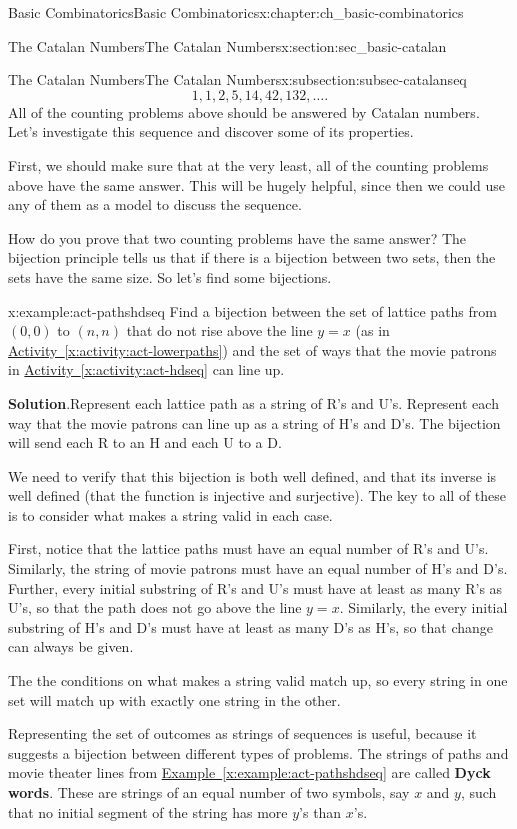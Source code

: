\documentclass[oneside,10pt,]{book}
\newcommand{\terminology}[1]{\textbf{#1}}
\numberwithin{equation}{chapter}
\begin{document}
\begin{chapterptx}{Basic Combinatorics}{}{Basic Combinatorics}{}{}{x:chapter:ch_basic-combinatorics}
\begin{sectionptx}{The Catalan Numbers}{}{The Catalan Numbers}{}{}{x:section:sec_basic-catalan}
\begin{subsectionptx}{The Catalan Numbers}{}{The Catalan Numbers}{}{}{x:subsection:subsec-catalanseq}
\begin{equation*}
1, 1, 2, 5, 14, 42, 132, \ldots\text{.}
\end{equation*}
All of the counting problems above should be answered by Catalan numbers.  Let's investigate this sequence and discover some of its properties.%
\par
First, we should make sure that at the very least, all of the counting problems above have the same answer.  This will be hugely helpful, since then we could use any of them as a model to discuss the sequence.%
\par
How do you prove that two counting problems have the same answer?  The bijection principle tells us that if there is a bijection between two sets, then the sets have the same size.  So let's find some bijections.%
\begin{example}{}{x:example:act-pathshdseq}%
Find a bijection between the set of lattice paths from \((0,0)\) to \((n,n)\) that do not rise above the line \(y = x\) (as in \hyperref[x:activity:act-lowerpaths]{Activity~\ref{x:activity:act-lowerpaths}}) and the set of ways that the movie patrons in \hyperref[x:activity:act-hdseq]{Activity~\ref{x:activity:act-hdseq}} can line up.%
\par\smallskip%
\noindent\textbf{Solution}.\hypertarget{g:solution:idm3403}{}\quad{}Represent each lattice path as a string of R's and U's.  Represent each way that the movie patrons can line up as a string of H's and D's.  The bijection will send each R to an H and each U to a D.%
\par
We need to verify that this bijection is both well defined, and that its inverse is well defined (that the function is injective and surjective).  The key to all of these is to consider what makes a string valid in each case.%
\par
First, notice that the lattice paths must have an equal number of R's and U's.  Similarly, the string of movie patrons must have an equal number of H's and D's. Further, every initial substring of R's and U's must have at least as many R's as U's, so that the path does not go above the line \(y=x\).  Similarly, the every initial substring of H's and D's must have at least as many D's as H's, so that change can always be given.%
\par
The the conditions on what makes a string valid match up, so every string in one set will match up with exactly one string in the other.%
\end{example}
Representing the set of outcomes as strings of sequences is useful, because it suggests a bijection between different types of problems.  The strings of paths and movie theater lines from \hyperref[x:example:act-pathshdseq]{Example~\ref{x:example:act-pathshdseq}} are called \terminology{Dyck words}.  These are strings of an equal number of two symbols, say \(x\) and \(y\), such that no initial segment of the string has more \(y\)'s than \(x\)'s.%

\end{subsectionptx}
\end{sectionptx}
\end{chapterptx}
\end{document}
